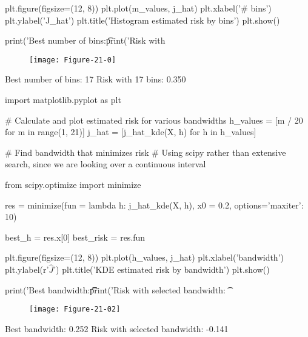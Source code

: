 \begin{python}
plt.figure(figsize=(12, 8))
plt.plot(m_values, j_hat)
plt.xlabel('# bins')
plt.ylabel('J_hat')
plt.title('Histogram estimated risk by bins')
plt.show()

print('Best number of bins:\t%
print('Risk with %
\end{python}

\begin{figure}[H]
\texttt{[image: Figure-21-0]}
\end{figure}

\begin{console}
Best number of bins:    17
Risk with 17 bins:      0.350
\end{console}

\begin{python}
import matplotlib.pyplot as plt

# Calculate and plot estimated risk for various bandwidths
h_values = [m / 20 for m in range(1, 21)]
j_hat = [j_hat_kde(X, h) for h in h_values]
\end{python}

\begin{python}
# Find bandwidth that minimizes risk
# Using scipy rather than extensive search, since we are looking over a continuous interval

from scipy.optimize import minimize

res = minimize(fun = lambda h: j_hat_kde(X, h), x0 = 0.2, options={'maxiter': 10})

best_h = res.x[0]
best_risk = res.fun
\end{python}

\begin{python}
plt.figure(figsize=(12, 8))
plt.plot(h_values, j_hat)
plt.xlabel('bandwidth')
plt.ylabel(r'$\hat{J}$')
plt.title('KDE estimated risk by bandwidth')
plt.show()

print('Best bandwidth:\t\t\t%
print('Risk with selected bandwidth: \t%
\end{python}

\begin{figure}[H]
\texttt{[image: Figure-21-02]}
\end{figure}
    
\begin{console}
Best bandwidth:                 0.252
Risk with selected bandwidth:   -0.141
\end{console}

